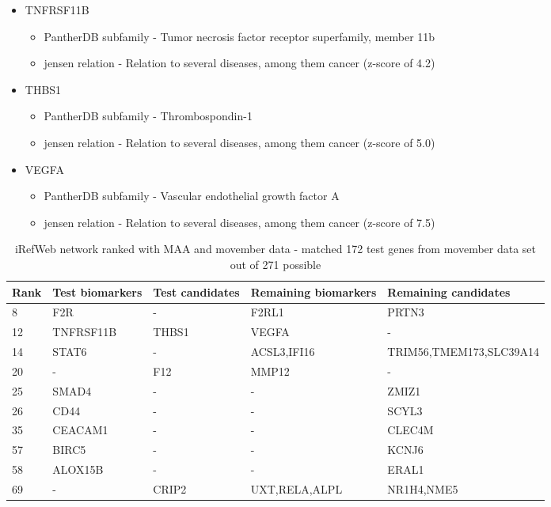 \begin{itemize}
    \item TNFRSF11B
        \begin{itemize}
            \item PantherDB subfamily - Tumor necrosis factor receptor
                superfamily, member 11b
            \item \gls{jensen} relation - Relation to several diseases, among
                them cancer (z-score of 4.2)
        \end{itemize}
    \item THBS1
        \begin{itemize}
            \item PantherDB subfamily - Thrombospondin-1
            \item \gls{jensen} relation - Relation to several diseases, among
                them cancer (z-score of 5.0)
        \end{itemize}
    \item VEGFA
        \begin{itemize}
            \item PantherDB subfamily - Vascular endothelial growth factor A
            \item \gls{jensen} relation - Relation to several diseases, among
                them cancer (z-score of 7.5)
        \end{itemize}
\end{itemize}

\begin{sidewaystable}
    \begin{tabular}{|l|l|l|l|l|}
        \hline
        \textbf{Rank}
        & \textbf{Test biomarkers}
        & \textbf{Test candidates}
        & \textbf{Remaining biomarkers}
        & \textbf{Remaining candidates} \\
        \hline
        8	& F2R	& -	& F2RL1	& PRTN3 \\
        \hline
        12	& TNFRSF11B	& THBS1	& VEGFA	& - \\
        \hline
        14	& STAT6	& -	& ACSL3,IFI16	& TRIM56,TMEM173,SLC39A14 \\
        \hline
        20	& -	& F12	& MMP12	& - \\
        \hline
        25	& SMAD4	& -	& -	& ZMIZ1 \\
        \hline
        26	& CD44	& -	& -	& SCYL3 \\
        \hline
        35	& CEACAM1	& -	& -	& CLEC4M \\
        \hline
        57	& BIRC5	& -	& -	& KCNJ6 \\
        \hline
        58	& ALOX15B	& -	& -	& ERAL1 \\
        \hline
        69	& -	& CRIP2	& UXT,RELA,ALPL	& NR1H4,NME5 \\
        \hline
    \end{tabular}
    \caption{iRefWeb network ranked with MAA and movember data - matched 172
    test genes from movember data set out of 271 possible}
    \label{tab:maa-movember}
\end{sidewaystable}

